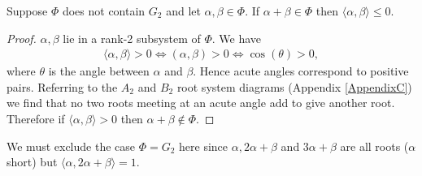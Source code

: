 \begin{lemma} \label{ufixes} Suppose $\Phi$ does not contain $G_2$ and let $\alpha,\beta\in\Phi$. If $\alpha + \beta \in \Phi$ then $\langle \alpha, \beta \rangle \leq 0$.
\end{lemma}
\begin{proof} $\alpha, \beta$ lie in a rank-2 subsystem of $\Phi$. We have
\begin{align*}
\langle \alpha, \beta \rangle > 0 \Longleftrightarrow (\alpha, \beta) >0 \Longleftrightarrow \cos(\theta) > 0,
\end{align*}
where $\theta$ is the angle between $\alpha$ and $\beta$. Hence acute angles correspond to positive pairs. Referring to the $A_2$ and $B_2$ root system diagrams (Appendix \ref{AppendixC}) we find that no two roots meeting at an acute angle add to give another root. Therefore if $\langle \alpha, \beta \rangle > 0$ then $\alpha + \beta \notin \Phi$.
\end{proof}

We must exclude the case $\Phi = G_2$ here since $\alpha, 2\alpha + \beta$ and $3\alpha + \beta$ are all roots ($\alpha$ short) but $\langle \alpha, 2\alpha + \beta \rangle = 1$.

